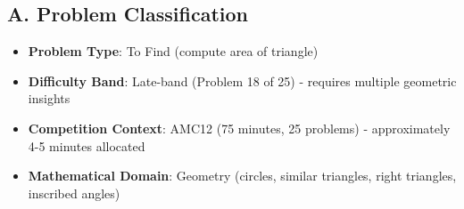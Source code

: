 \documentclass[]{article}
\begin{document}
\begin{problemconfigbox}
\subsection*{A. Problem Classification}
\begin{itemize}[leftmargin=*]
    \item \textbf{Problem Type}: To Find (compute area of triangle)
    \item \textbf{Difficulty Band}: Late-band (Problem 18 of 25) - requires multiple geometric insights
    \item \textbf{Competition Context}: AMC12 (75 minutes, 25 problems) - approximately 4-5 minutes allocated
    \item \textbf{Mathematical Domain}: Geometry (circles, similar triangles, right triangles, inscribed angles)
\end{itemize}


\end{problemconfigbox}
\end{document}
